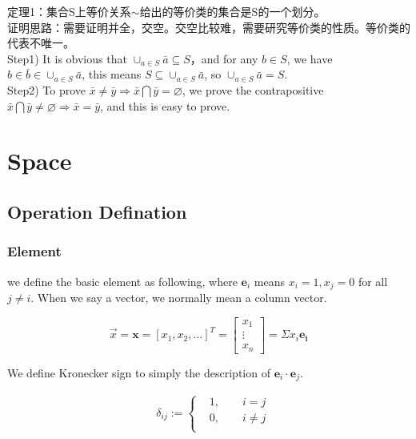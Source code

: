 \documentclass[UTF8]{../09-Mathematics}
\begin{document}
定理1：集合S上等价关系$\sim$给出的等价类的集合是S的一个划分。\\
证明思路：需要证明并全，交空。交空比较难，需要研究等价类的性质。等价类的代表不唯一。\\
Step1)  It is obvious that $\cup _{a \in S} {\bar a} \subseteq S$，and for any $b \in S$, we have $b \in \bar b \in \cup _{a \in S} {\bar a}$, this means $S \subseteq \cup _{a \in S} {\bar a}  $, so $ \cup _{a \in S} {\bar a} =S $.\\
Step2) To prove $\bar x \neq \bar y \Rightarrow \bar x \bigcap \bar y = \varnothing  $, we prove the contrapositive $ \bar x \bigcap \bar y \neq \varnothing \Rightarrow  \bar x = \bar y$, and this is easy to prove.\\







\section{Space}

\subsection{Operation Defination}

\subsubsection{Element}

we define the basic element as following, where $ \boldsymbol e_i $ means $x_i = 1, x_j = 0$ for all $j \neq i$. When we say a vector, we normally mean a column vector.

\begin{equation}
\vec{x}  = \boldsymbol x = [x_1, x_2,\dots]^T
= \begin{bmatrix}
    x_1 \\
    \vdots \\
    x_n
\end{bmatrix}
= \Sigma x_i \boldsymbol{e_i} 
\end{equation}

We define Kronecker sign to simply the description of $\boldsymbol e_i \cdot \boldsymbol e_j $.

\begin{equation}
    \begin{split}
    &\delta _{ij}:=
    \begin{cases}
    &1,\qquad i = j\\
    &0,\qquad i \neq j\\
    \end{cases}\\
    \end{split}
\end{equation}
\end{document}
